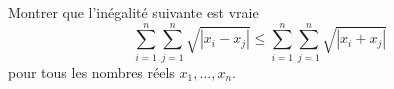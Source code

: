 Montrer que l'inégalité suivante est vraie
\[
\sum_{i=1}^{n} \sum_{j=1}^{n} \sqrt{|x_i - x_j|} \leqslant \sum_{i=1}^{n} \sum_{j=1}^{n} \sqrt{|x_i + x_j|}
\]
pour tous les nombres réels $x_1, \ldots, x_n$.
